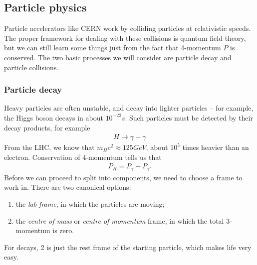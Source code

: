 \documentclass{../../template/note}
\begin{document}
    \subsection{Particle physics}

    Particle accelerators like CERN work by colliding particles at relativistic speeds. The proper framework for dealing with these collisions is quantum field theory, but we can still learn some things just from the fact that 4-momentum \(P\) is conserved. The two basic processes we will consider are particle decay and particle collisions.

    \subsubsection{Particle decay}

    Heavy particles are often unstable, and decay into lighter particles -- for example, the Higgs boson decays in about \(10^{-22} \si{s}\). Such particles must be detected by their decay products, for example
    \begin{align*}
        H \longrightarrow \gamma + \gamma
    \end{align*}
    From the LHC, we know that \(m_H c^2 \approx 125 \si{GeV}\), about \(10^5\) times heavier than an electron. Conservation of 4-momentum tells us that
    \begin{align*}
        P_H = P_\gamma + P_{\gamma'}
    \end{align*}
    Before we can proceed to split into components, we need to choose a frame to work in. There are two canonical options:
    \begin{enumerate}
        \item the \emph{lab frame}, in which the particles are moving;
        \item the \emph{centre of mass} or \emph{centre of momentum} frame, in which the total 3-momentum is zero.
    \end{enumerate}
    For decays, 2 is just the rest frame of the starting particle, which makes life very easy.   
    
    
\end{document}
